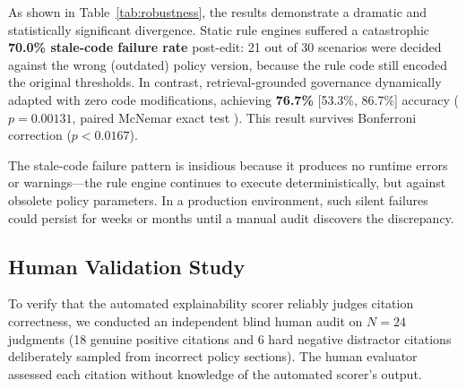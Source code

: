 \documentclass[sigconf,screen]{acmart}
\begin{document}
As shown in Table~\ref{tab:robustness}, the results demonstrate a dramatic and statistically significant divergence. Static rule engines suffered a catastrophic \textbf{70.0\% stale-code failure rate} post-edit: 21 out of 30 scenarios were decided against the wrong (outdated) policy version, because the rule code still encoded the original thresholds. In contrast, retrieval-grounded governance dynamically adapted with zero code modifications, achieving \textbf{76.7\%} [53.3\%, 86.7\%] accuracy ($p = 0.00131$, paired McNemar exact test \cite{mcnemar1947note}). This result survives Bonferroni correction ($p < 0.0167$).

The stale-code failure pattern is insidious because it produces no runtime errors or warnings---the rule engine continues to execute deterministically, but against obsolete policy parameters. In a production environment, such silent failures could persist for weeks or months until a manual audit discovers the discrepancy.

\begin{table}[t]
\centering
\footnotesize
\setlength{\tabcolsep}{3.5pt}
\renewcommand{\arraystretch}{1.15}
\caption{Explainability Scoring Human Validation ($N=24$ Blind)}
\label{tab:human_audit}
\end{table}

\subsection{Human Validation Study}
To verify that the automated explainability scorer reliably judges citation correctness, we conducted an independent blind human audit on $N=24$ judgments (18 genuine positive citations and 6 hard negative distractor citations deliberately sampled from incorrect policy sections). The human evaluator assessed each citation without knowledge of the automated scorer's output.
\end{document}
